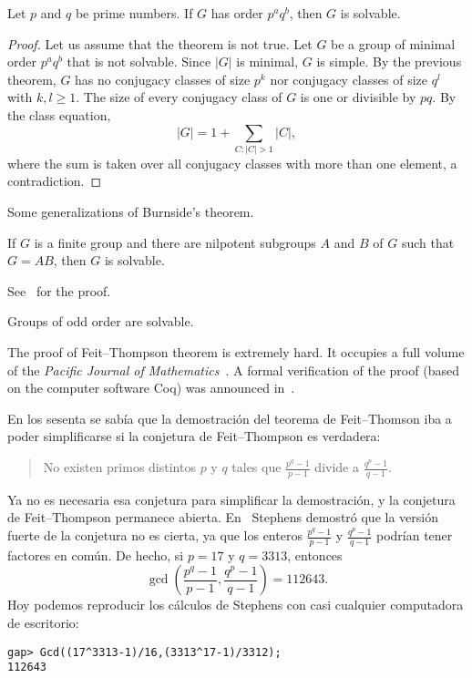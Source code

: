 \begin{theorem}[Burnside]
  Let $p$ and $q$ be prime numbers. If $G$ has order $p^aq^b$, then $G$ is solvable.
\end{theorem}

\begin{proof}
	Let us assume that the theorem is not true. Let $G$ be a group
	of minimal order $p^aq^b$
	that is not solvable. Since $|G|$ is minimal, $G$ is simple. By the previous theorem, 
	$G$ has no conjugacy classes of size $p^k$ nor 
	conjugacy classes of size $q^l$ with $k,l\geq1$. The size
	of every conjugacy class of $G$ is one or divisible by $pq$. 
	By the class
	equation, 
	\[
		|G|=1+\sum_{C:|C|>1}|C|,
	\]
	where the sum is taken over all conjugacy classes 
	with more than one element, a contradiction.
\end{proof}

Some generalizations of Burnside's theorem. 

\begin{theorem}
    If $G$ is a finite group and there are nilpotent subgroups 
    $A$ and $B$ of $G$ such that 
    $G=AB$, then $G$ is solvable.
\end{theorem}

See~\cite[Theorem 2.4.3]{MR1211633} for the proof.

\begin{theorem}
    Groups of odd order are solvable. 
\end{theorem}

The proof of Feit--Thompson theorem is extremely hard. 
It occupies a full volume of the 
\emph{Pacific Journal of Mathematics}~\cite{MR166261}. 
A formal verification of the proof 
(based on the computer software Coq) 
was announced in~\cite{MR3111271}.  

\medskip
{}
En los sesenta se sabía que la demostración del teorema de Feit--Thomson iba a poder simplificarse 
si la conjetura de Feit--Thompson es verdadera:

\begin{quote}
    No existen primos distintos $p$ y $q$ tales que
    $\frac {p^{q}-1}{p-1}$ divide a $\frac{q^{p} - 1}{q - 1}$. 
\end{quote}

Ya no es necesaria esa conjetura para simplificar la demostración, 
y la conjetura de Feit--Thompson permanece abierta. 
En~\cite{MR297686} 
Stephens demostró que la versión fuerte de la conjetura no es cierta, ya que 
los enteros $\frac {p^{q}-1}{p-1}$ y $\frac{q^{p} - 1}{q - 1}$ 
podrían tener factores en común. De hecho, si $p=17$ y $q=3313$, 
entonces 
\[
\gcd\left(\frac {p^{q}-1}{p-1},\frac{q^{p} - 1}{q - 1}\right)=112643.
\]
Hoy podemos reproducir los cálculos de 
Stephens con casi cualquier computadora de escritorio:
\begin{lstlisting}
gap> Gcd((17^3313-1)/16,(3313^17-1)/3312);
112643
\end{lstlisting}

